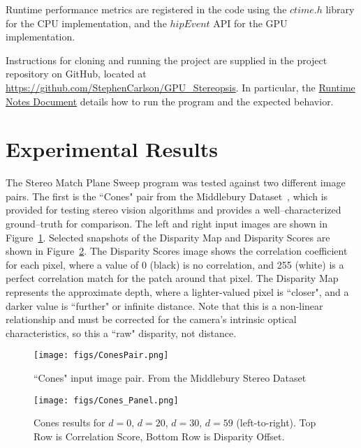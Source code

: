 \documentclass[runningheads]{llncs}
\begin{document}
Runtime performance metrics are registered in the code using the $ctime.h$ library for the CPU implementation, and the $hipEvent$ API for the GPU implementation.


Instructions for cloning and running the project are supplied in the project repository on GitHub, located at \href{https://github.com/StephenCarlson/GPU\_Stereopsis}{https://github.com/StephenCarlson/GPU\_Stereopsis}. In particular, the \href{https://github.com/StephenCarlson/GPU\_Stereopsis/blob/master/RuntimeNotes.md}{Runtime Notes Document} details how to run the program and the expected behavior. 


\section{Experimental Results}

The Stereo Match Plane Sweep program was tested against two different image pairs. The first is the ``Cones" pair from the Middlebury Dataset~\cite{scharstein2003high}, which is provided for testing stereo vision algorithms and provides a well--characterized ground--truth for comparison. The left and right input images are shown in Figure~\ref{fig-ConesInput}. Selected snapshots of the Disparity Map and Disparity Scores are shown in Figure~\ref{fig-ConesResults}. The Disparity Scores image shows the correlation coefficient for each pixel, where a value of 0 (black) is no correlation, and 255 (white) is a perfect correlation match for the patch around that pixel. The Disparity Map represents the approximate depth, where a lighter-valued pixel is ``closer", and a darker value is ``further" or infinite distance. Note that this is a non-linear relationship and must be corrected for the camera's intrinsic optical characteristics, so this a ``raw" disparity, not distance.

\begin{figure}
\texttt{[image: figs/ConesPair.png]}
\caption{``Cones" input image pair. From the Middlebury Stereo Dataset~\cite{scharstein2003high}} \label{fig-ConesInput}
\end{figure}

\begin{figure}
\texttt{[image: figs/Cones\_Panel.png]}
\caption{Cones results for $d=0$, $d=20$, $d=30$, $d=59$ (left-to-right). Top Row is Correlation Score, Bottom Row is Disparity Offset.} \label{fig-ConesResults}
\end{figure}
\end{document}
